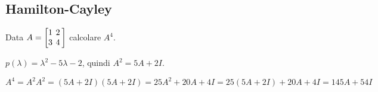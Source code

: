 \subsection{Hamilton-Cayley}

Data $A = \left[
\arraycolsep=2.0pt\def\arraystretch{1.0}
\begin{array}{@{}ccc@{}}
1 & 2 \\
3 & 4 \\
\end{array}
\right]$ calcolare $A^4$.

$p(\lambda) = \lambda^2-5\lambda-2$, quindi $A^2=5A+2I$.

$A^4 = A^2A^2 = (5A+2I)(5A+2I) = 25A^2+20A+4I = 25(5A+2I)+20A+4I = 145A + 54I$